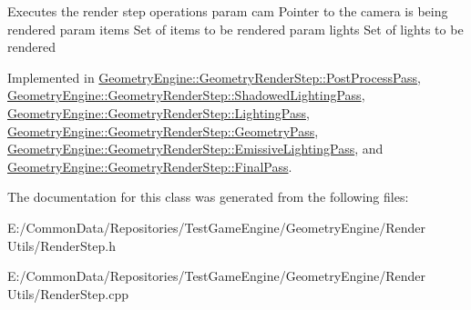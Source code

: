Executes the render step operations param cam Pointer to the camera is being rendered param items Set of items to be rendered param lights Set of lights to be rendered 

Implemented in \mbox{\hyperlink{class_geometry_engine_1_1_geometry_render_step_1_1_post_process_pass_a2ebe2a0b940e47ccd10e649bff77138d}{Geometry\+Engine\+::\+Geometry\+Render\+Step\+::\+Post\+Process\+Pass}}, \mbox{\hyperlink{class_geometry_engine_1_1_geometry_render_step_1_1_shadowed_lighting_pass_af52807435083cd96125e6ef6d7453027}{Geometry\+Engine\+::\+Geometry\+Render\+Step\+::\+Shadowed\+Lighting\+Pass}}, \mbox{\hyperlink{class_geometry_engine_1_1_geometry_render_step_1_1_lighting_pass_ae6d9fa99f67e659839ca310947787f52}{Geometry\+Engine\+::\+Geometry\+Render\+Step\+::\+Lighting\+Pass}}, \mbox{\hyperlink{class_geometry_engine_1_1_geometry_render_step_1_1_geometry_pass_ac3bfd0a3915cd8a8cd7e1bf81157f6ad}{Geometry\+Engine\+::\+Geometry\+Render\+Step\+::\+Geometry\+Pass}}, \mbox{\hyperlink{class_geometry_engine_1_1_geometry_render_step_1_1_emissive_lighting_pass_adffe18f64968290aedda426bc4450414}{Geometry\+Engine\+::\+Geometry\+Render\+Step\+::\+Emissive\+Lighting\+Pass}}, and \mbox{\hyperlink{class_geometry_engine_1_1_geometry_render_step_1_1_final_pass_ad078d0e9d394754dbbd3cff871d72b9f}{Geometry\+Engine\+::\+Geometry\+Render\+Step\+::\+Final\+Pass}}.



The documentation for this class was generated from the following files\+:\begin{DoxyCompactItemize}
\item 
E\+:/\+Common\+Data/\+Repositories/\+Test\+Game\+Engine/\+Geometry\+Engine/\+Render Utils/Render\+Step.\+h\item 
E\+:/\+Common\+Data/\+Repositories/\+Test\+Game\+Engine/\+Geometry\+Engine/\+Render Utils/Render\+Step.\+cpp\end{DoxyCompactItemize}
